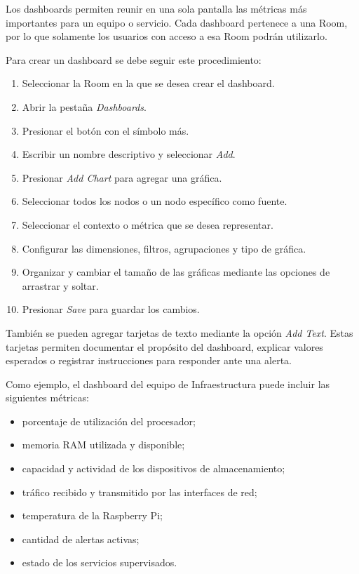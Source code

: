 Los dashboards permiten reunir en una sola pantalla las métricas más importantes para
un equipo o servicio. Cada dashboard pertenece a una Room, por lo que solamente los
usuarios con acceso a esa Room podrán utilizarlo.

Para crear un dashboard se debe seguir este procedimiento:

\begin{enumerate}
    \item Seleccionar la Room en la que se desea crear el dashboard.
    \item Abrir la pestaña \textit{Dashboards}.
    \item Presionar el botón con el símbolo más.
    \item Escribir un nombre descriptivo y seleccionar \textit{Add}.
    \item Presionar \textit{Add Chart} para agregar una gráfica.
    \item Seleccionar todos los nodos o un nodo específico como fuente.
    \item Seleccionar el contexto o métrica que se desea representar.
    \item Configurar las dimensiones, filtros, agrupaciones y tipo de gráfica.
    \item Organizar y cambiar el tamaño de las gráficas mediante las opciones de
          arrastrar y soltar.
    \item Presionar \textit{Save} para guardar los cambios.
\end{enumerate}

También se pueden agregar tarjetas de texto mediante la opción \textit{Add Text}. Estas
tarjetas permiten documentar el propósito del dashboard, explicar valores esperados o
registrar instrucciones para responder ante una alerta.

Como ejemplo, el dashboard del equipo de Infraestructura puede incluir las siguientes
métricas:

\begin{itemize}
    \item porcentaje de utilización del procesador;
    \item memoria RAM utilizada y disponible;
    \item capacidad y actividad de los dispositivos de almacenamiento;
    \item tráfico recibido y transmitido por las interfaces de red;
    \item temperatura de la Raspberry Pi;
    \item cantidad de alertas activas;
    \item estado de los servicios supervisados.
\end{itemize}

